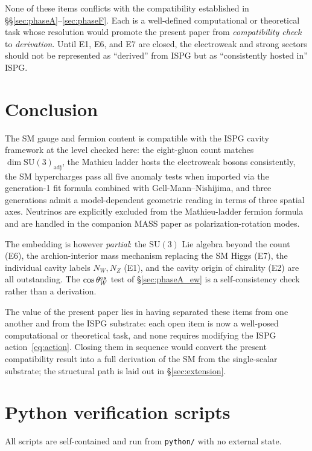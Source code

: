\documentclass[11pt]{article}
\begin{document}
\medskip
None of these items conflicts with the compatibility
established in \S\S\ref{sec:phaseA}--\ref{sec:phaseF}. Each is
a well-defined computational or theoretical task whose
resolution would promote the present paper from
\emph{compatibility check} to \emph{derivation}. Until E1, E6,
and E7 are closed, the electroweak and strong sectors should
not be represented as ``derived'' from ISPG but as
``consistently hosted in'' ISPG.

\section{Conclusion}
\label{sec:conclusion}

The SM gauge and fermion content is compatible with the ISPG
cavity framework at the level checked here: the eight-gluon
count matches $\dim\mathrm{SU}(3)_{\mathrm{adj}}$, the Mathieu
ladder hosts the electroweak bosons consistently, the SM
hypercharges pass all five anomaly tests when imported via
the generation-1 fit formula combined with
Gell-Mann--Nishijima, and three generations admit a
model-dependent geometric reading in terms of three spatial
axes. Neutrinos are explicitly excluded from the Mathieu-ladder
fermion formula and are handled in the companion MASS paper as
polarization-rotation modes.

The embedding is however \emph{partial}: the $\mathrm{SU}(3)$
Lie algebra beyond the count (E6), the archion-interior mass
mechanism replacing the SM Higgs (E7), the individual cavity
labels $N_W,N_Z$ (E1), and the cavity origin of chirality (E2)
are all outstanding. The $\cos\theta_W^{\rm os}$ test of
\S\ref{sec:phaseA_ew} is a self-consistency check rather than
a derivation.

The value of the present paper lies in having separated these
items from one another and from the ISPG substrate: each open
item is now a well-posed computational or theoretical task,
and none requires modifying the ISPG action~\eqref{eq:action}.
Closing them in sequence would convert the present
compatibility result into a full derivation of the SM from the
single-scalar substrate; the structural path is laid out in
\S\ref{sec:extension}.

\appendix

\section{Python verification scripts}
\label{app:scripts}

All scripts are self-contained and run from
\texttt{python/} with no external state.
\end{document}
